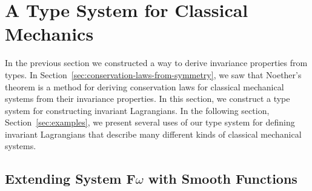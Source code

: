 \documentclass[preprint]{sigplanconf}
\theoremstyle{examplestyle}
\begin{document}



\section{A Type System for Classical Mechanics}
\label{sec:types-for-classical-mech}

In the previous section we constructed a way to derive invariance
properties from types. In
Section~\ref{sec:conservation-laws-from-symmetry}, we saw that
Noether's theorem is a method for deriving conservation laws for
classical mechanical systems from their invariance properties. In this
section, we construct a type system for constructing invariant
Lagrangians. In the following section, Section~\ref{sec:examples}, we
present several uses of our type system for defining invariant
Lagrangians that describe many different kinds of classical mechanical
systems.

\subsection{Extending System F$\omega$ with Smooth Functions}
\label{sec:types-for-classical-mech-1}
\end{document}
